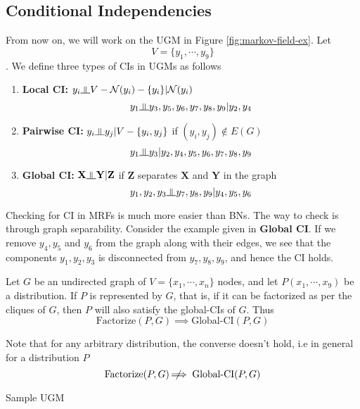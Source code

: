 \subsection{Conditional Independencies}
From now on, we will work on the UGM in Figure \ref{fig:markov-field-ex}. Let $$V = \{y_1, \cdots, y_9\}$$. We define three types of CIs in UGMs as follows
\begin{enumerate}
	\item \textbf{Local CI:} $y_i \ind V - \mathcal{N}(y_i) - \{y_i\} | \mathcal{N}(y_i)$
	\[y_1 \ind y_3, y_5, y_6, y_7, y_8, y_9 | y_2, y_4\]
	\item \textbf{Pairwise CI:} $y_i \ind y_j | V - \{y_i, y_j\}$ if $(y_i, y_j) \notin E(G)$
	\[y_1 \ind y_3 | y_2, y_4, y_5, y_6, y_7, y_8, y_9\]
	\item \textbf{Global CI:} $\mathbf{X \ind Y | Z}$ if $\mathbf{Z}$ separates $\mathbf X$ and $\mathbf Y$ in the graph
	\[y_1, y_2, y_3 \ind y_7, y_8, y_9 | y_4, y_5, y_6\]
\end{enumerate}
Checking for CI in MRFs is much more easier than BNs. The way to check is through graph separability. Consider the example given in \textbf{Global CI}. If we remove $y_4, y_5$ and $y_6$ from the graph along with their edges, we see that the components $y_1, y_2, y_3$ is disconnected from $y_7, y_8, y_9$, and hence the CI holds.
\begin{thm}
Let $G$ be an undirected graph of $V = \{x_1, \cdots, x_n\}$ nodes, and let $P(x_1, \cdots, x_9)$ be a distribution. If $P$ is represented by $G$, that is, if it can be factorized as per the cliques of $G$, then $P$ will also satisfy the global-CIs of $G$. Thus
\begin{equation}
	\text{Factorize}(P, G) \implies \text{Global-CI}(P, G)
\end{equation}
\end{thm}
Note that for any arbitrary distribution, the converse doesn't hold, i.e in general for a distribution $P$
\begin{equation}
	\text{Factorize}(P, G) \;\not\nobreak\!\!\!\!\implies \text{Global-CI}(P, G)
\end{equation}
\begin{marginfigure}
\centering
{}
\caption{Sample UGM}
\label{fig:global-not-fact}		
\end{marginfigure}
